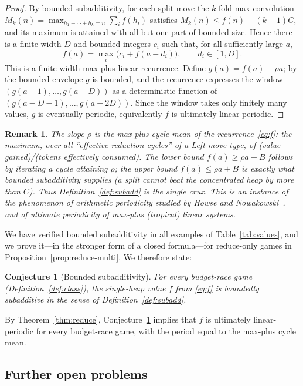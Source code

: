 \documentclass[11pt]{article}
\newtheorem{conjecture}[theorem]{Conjecture}
\newtheorem{remark}[theorem]{Remark}
\begin{document}
\begin{proof}
By bounded subadditivity, for each split move the $k$-fold max-convolution
$M_k(n)=\max_{h_1+\cdots+h_k=n}\sum_i f(h_i)$ satisfies $M_k(n)\le f(n)+(k-1)C$, and its
maximum is attained with all but one part of bounded size. Hence there is a finite width $D$
and bounded integers $c_i$ such that, for all sufficiently large $a$,
\[
f(a)=\max_i\bigl(c_i+f(a-d_i)\bigr),\qquad d_i\in[1,D] .
\]
This is a finite-width max-plus linear recurrence. Define $g(a)=f(a)-\rho a$; by the bounded
envelope $g$ is bounded, and the recurrence expresses the window
$(g(a-1),\dots,g(a-D))$ as a deterministic function of $(g(a-D-1),\dots,g(a-2D))$. Since the
window takes only finitely many values, $g$ is eventually periodic, equivalently $f$ is
ultimately linear-periodic.
\end{proof}

\begin{remark}
The slope $\rho$ is the \emph{max-plus cycle mean} of the recurrence~\eqref{eq:f}: the
maximum, over all ``effective reduction cycles'' of a Left move type, of (value
gained)/(tokens effectively consumed). The lower bound $f(a)\ge\rho a-B$ follows by iterating
a cycle attaining $\rho$; the upper bound $f(a)\le\rho a+B$ is exactly what bounded
subadditivity supplies (a split cannot beat the concentrated heap by more than $C$). Thus
Definition~\ref{def:subadd} is the single crux. This is an instance of the phenomenon of
\emph{arithmetic periodicity} studied by Howse and Nowakowski~\cite{2004Hexa}, and of ultimate
periodicity of max-plus (tropical) linear systems.
\end{remark}

We have verified bounded subadditivity in all examples of Table~\ref{tab:values}, and we prove
it---in the stronger form of a closed formula---for reduce-only games in
Proposition~\ref{prop:reduce-multi}. We therefore state:

\begin{conjecture}[Bounded subadditivity]\label{conj:subadd}
For every budget-race game (Definition~\ref{def:class}), the single-heap value $f$ from
\eqref{eq:f} is boundedly subadditive in the sense of Definition~\ref{def:subadd}.
\end{conjecture}

By Theorem~\ref{thm:reduce}, Conjecture~\ref{conj:subadd} implies that $f$ is ultimately
linear-periodic for every budget-race game, with the period equal to the max-plus cycle mean.

\subsection{Further open problems}
\end{document}
